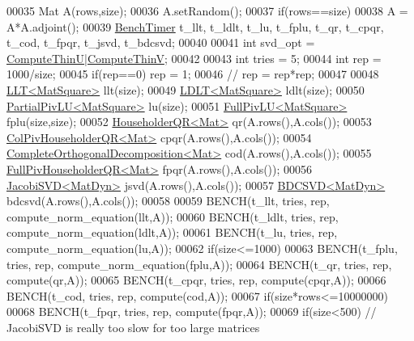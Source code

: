 \begin{DoxyCode}
00035   Mat A(rows,size);
00036   A.setRandom();
00037   \textcolor{keywordflow}{if}(rows==size)
00038     A = A*A.adjoint();
00039   \hyperlink{class_eigen_1_1_bench_timer}{BenchTimer} t\_llt, t\_ldlt, t\_lu, t\_fplu, t\_qr, t\_cpqr, t\_cod, t\_fpqr, t\_jsvd, t\_bdcsvd;
00040 
00041   \textcolor{keywordtype}{int} svd\_opt = \hyperlink{group__enums_ggae3e239fb70022eb8747994cf5d68b4a9af8c742a1aa87773e165eae406c9ccaf8}{ComputeThinU}|\hyperlink{group__enums_ggae3e239fb70022eb8747994cf5d68b4a9a1055e53fa95c8ae04a07ebb72cfafd95}{ComputeThinV};
00042   
00043   \textcolor{keywordtype}{int} tries = 5;
00044   \textcolor{keywordtype}{int} rep = 1000/size;
00045   \textcolor{keywordflow}{if}(rep==0) rep = 1;
00046 \textcolor{comment}{//   rep = rep*rep;}
00047   
00048   \hyperlink{group___cholesky___module_class_eigen_1_1_l_l_t}{LLT<MatSquare>} llt(size);
00049   \hyperlink{group___cholesky___module_class_eigen_1_1_l_d_l_t}{LDLT<MatSquare>} ldlt(size);
00050   \hyperlink{group___l_u___module_class_eigen_1_1_partial_piv_l_u}{PartialPivLU<MatSquare>} lu(size);
00051   \hyperlink{group___l_u___module_class_eigen_1_1_full_piv_l_u}{FullPivLU<MatSquare>} fplu(size,size);
00052   \hyperlink{group___q_r___module_class_eigen_1_1_householder_q_r}{HouseholderQR<Mat>} qr(A.rows(),A.cols());
00053   \hyperlink{group___q_r___module_class_eigen_1_1_col_piv_householder_q_r}{ColPivHouseholderQR<Mat>} cpqr(A.rows(),A.cols());
00054   \hyperlink{group___q_r___module_class_eigen_1_1_complete_orthogonal_decomposition}{CompleteOrthogonalDecomposition<Mat>} cod(A.rows(),A.cols());
00055   \hyperlink{group___q_r___module_class_eigen_1_1_full_piv_householder_q_r}{FullPivHouseholderQR<Mat>} fpqr(A.rows(),A.cols());
00056   \hyperlink{group___s_v_d___module_class_eigen_1_1_jacobi_s_v_d}{JacobiSVD<MatDyn>} jsvd(A.rows(),A.cols());
00057   \hyperlink{group___s_v_d___module_class_eigen_1_1_b_d_c_s_v_d}{BDCSVD<MatDyn>} bdcsvd(A.rows(),A.cols());
00058   
00059   BENCH(t\_llt, tries, rep, compute\_norm\_equation(llt,A));
00060   BENCH(t\_ldlt, tries, rep, compute\_norm\_equation(ldlt,A));
00061   BENCH(t\_lu, tries, rep, compute\_norm\_equation(lu,A));
00062   \textcolor{keywordflow}{if}(size<=1000)
00063     BENCH(t\_fplu, tries, rep, compute\_norm\_equation(fplu,A));
00064   BENCH(t\_qr, tries, rep, compute(qr,A));
00065   BENCH(t\_cpqr, tries, rep, compute(cpqr,A));
00066   BENCH(t\_cod, tries, rep, compute(cod,A));
00067   \textcolor{keywordflow}{if}(size*rows<=10000000)
00068     BENCH(t\_fpqr, tries, rep, compute(fpqr,A));
00069   \textcolor{keywordflow}{if}(size<500) \textcolor{comment}{// JacobiSVD is really too slow for too large matrices}

\end{DoxyCode}

